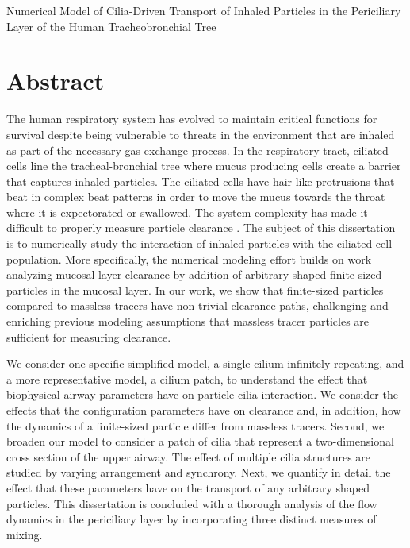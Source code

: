 \begin{center}
   Numerical Model of Cilia-Driven Transport of Inhaled Particles in the Periciliary Layer of the Human Tracheobronchial Tree
\end{center}\vspace{-1cm}
{}
\section*{Abstract}\label{sec:abstract}

The human respiratory system has evolved to maintain critical functions for survival despite being vulnerable to threats in the environment that are inhaled as part of the necessary gas exchange process. In the respiratory tract, ciliated cells line the tracheal-bronchial tree where mucus producing cells create a barrier that captures inhaled particles. The ciliated cells have hair like protrusions that beat in complex beat patterns in order to move the mucus towards the throat where it is expectorated or swallowed. The system complexity has made it difficult to properly measure particle clearance \invivo. The subject of this dissertation is to numerically study the interaction of inhaled particles with the ciliated cell population. More specifically, the numerical modeling effort builds on work analyzing mucosal layer clearance by addition of arbitrary shaped finite-sized particles in the mucosal layer. In our work, we show that finite-sized particles compared to massless tracers have non-trivial clearance paths, challenging and enriching previous modeling assumptions that massless tracer particles are sufficient for measuring clearance.

We consider one specific simplified model, a single cilium infinitely repeating, and a more representative model, a cilium patch, to understand the effect that biophysical airway parameters have on particle-cilia interaction. We consider the effects that the configuration parameters have on clearance and, in addition, how the dynamics of a finite-sized particle differ from massless tracers. Second, we broaden our model to consider a patch of cilia that represent a two-dimensional cross section of the upper airway. The effect of multiple cilia structures are studied by varying arrangement and synchrony. Next, we quantify in detail the effect that these parameters have on the transport of any arbitrary shaped particles. This dissertation is concluded with a thorough analysis of the flow dynamics in the periciliary layer by incorporating three distinct measures of mixing.
